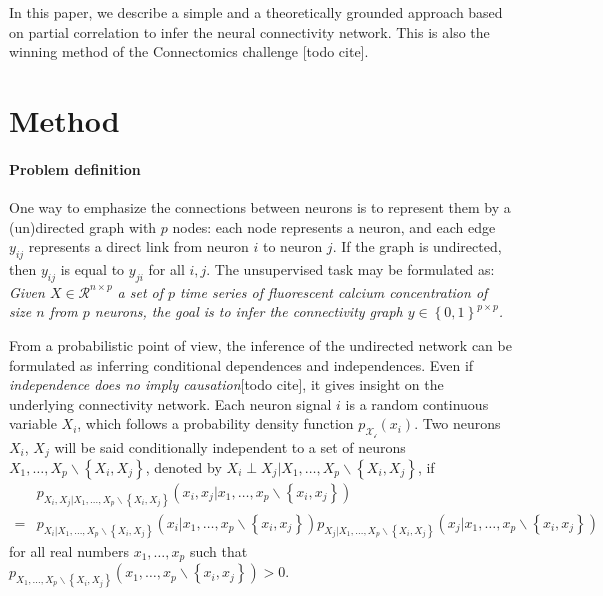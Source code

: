 \documentclass[wcp]{jmlr}
\begin{document}
In this paper, we describe a simple and a theoretically grounded approach
based on partial correlation to infer the neural connectivity network.
This is also the winning method of the Connectomics challenge [todo cite].

\section{Method}

\paragraph{Problem definition\\}

One way to emphasize the connections between neurons is to represent them by a
(un)directed graph with $p$ nodes: each node represents a neuron, and each
edge $y_{ij}$ represents a direct link from neuron  $i$ to neuron $j$. If the
graph is undirected, then $y_{ij}$ is equal to $y_{ji}$  for all $i,j$.
The unsupervised task may be formulated as:
\textit{Given $X \in \mathcal{R}^{n \times p}$  a set of $p$ time series of
fluorescent calcium concentration of size $n$ from $p$ neurons, the goal is to
infer the connectivity graph $y \in \left\{0, 1\right\}^{p \times p}$.}

From a probabilistic point of view, the inference of the undirected network
can be formulated as inferring conditional dependences and
independences.  Even if \textit{independence
does no imply causation}[todo cite], it gives insight on the underlying connectivity
network. Each neuron signal $i$ is a random continuous variable $X_i$,
which follows a probability density function $p_\mathcal{X_i}(x_i)$.
Two neurons $X_i$, $X_j$ will be said conditionally independent
to a set of neurons $X_1,\ldots,X_p \backslash \left\{X_i, X_j\right\}$, denoted
by  $X_i \perp X_j | X_1,\ldots,X_p \backslash \left\{X_i, X_j\right\}$,  if
\begin{align*}
&p_{X_i, X_j | X_1,\ldots,X_p \backslash \left\{X_i, X_j\right\}}
    (x_i, x_j | x_1,\ldots,x_p \backslash \left\{x_i, x_j\right\}) \\
=&p_{X_i | X_1,\ldots,X_p \backslash \left\{X_i, X_j\right\}}
    (x_i | x_1,\ldots,x_p \backslash \left\{x_i, x_j\right\})
p_{X_j | X_1,\ldots,X_p \backslash \left\{X_i, X_j\right\}}
    (x_j | x_1,\ldots,x_p \backslash \left\{x_i, x_j\right\})
\end{align*}
for all real numbers $x_1,\ldots,x_p $ such that
$p_{X_1,\ldots,X_p \backslash \left\{X_i, X_j\right\}}
 (x_1,\ldots,x_p \backslash \left\{x_i, x_j\right\}) > 0$.
\end{document}
